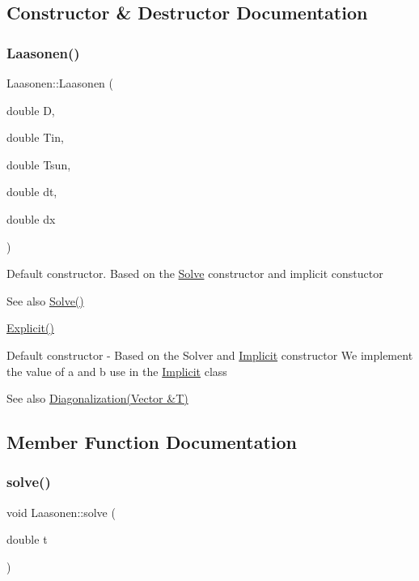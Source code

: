 \subsection{Constructor \& Destructor Documentation}
\mbox{\label{class_laasonen_ad20d5e371558ef7c4f04f730daef0049}} 
\subsubsection{\texorpdfstring{Laasonen()}{Laasonen()}}
{\footnotesize\ttfamily Laasonen\+::\+Laasonen (\begin{DoxyParamCaption}\item[{double}]{D,  }\item[{double}]{Tin,  }\item[{double}]{Tsun,  }\item[{double}]{dt,  }\item[{double}]{dx }\end{DoxyParamCaption})}

Default constructor. Based on the \hyperlink{class_solve}{Solve} constructor and implicit constuctor \begin{DoxySeeAlso}{See also}
\hyperlink{class_solve_a1e0efad6dcf6b09759dd38df7aa08db8}{Solve()} 

\hyperlink{class_explicit}{Explicit()}
\end{DoxySeeAlso}
Default constructor -\/ Based on the Solver and \hyperlink{class_implicit}{Implicit} constructor We implement the value of a and b use in the \hyperlink{class_implicit}{Implicit} class \begin{DoxySeeAlso}{See also}
\hyperlink{class_implicit_a572fff2232977c83c432f993f37a7853}{Diagonalization(\+Vector \&\+T)} 
\end{DoxySeeAlso}


\subsection{Member Function Documentation}
\mbox{\label{class_laasonen_aaa49ab7d15fbfef94a57a0e89977d1c6}} 
\subsubsection{\texorpdfstring{solve()}{solve()}}
{\footnotesize\ttfamily void Laasonen\+::solve (\begin{DoxyParamCaption}\item[{double}]{t }\end{DoxyParamCaption})\hspace{0.3cm}{\ttfamily [virtual]}}

